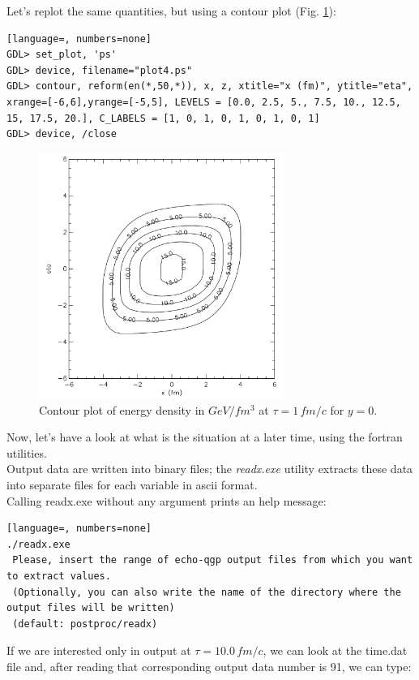 Let's replot the same quantities, but using a contour plot (Fig. \ref{plot4}):
\begin{lstlisting}[language=, numbers=none]
GDL> set_plot, 'ps'
GDL> device, filename="plot4.ps"
GDL> contour, reform(en(*,50,*)), x, z, xtitle="x (fm)", ytitle="eta", xrange=[-6,6],yrange=[-5,5], LEVELS = [0.0, 2.5, 5., 7.5, 10., 12.5, 15, 17.5, 20.], C_LABELS = [1, 0, 1, 0, 1, 0, 1, 0, 1]
GDL> device, /close
\end{lstlisting}
\begin{figure}[!h]
 \begin{center}
  \includegraphics[width=8cm]{images/plot4.pdf}
   \caption{Contour plot of energy density in $GeV/fm^3$ at $\tau=1\,fm/c$ for $y=0$.}
    \label{plot4}
 \end{center}
\end{figure}
Now, let's have a look at what is the situation at a later time, using the fortran utilities.\\
Output data are written into binary files; the \emph{readx.exe} utility extracts these data into separate files for each variable in ascii format.\\
Calling readx.exe without any argument prints an help message:\\
\begin{lstlisting}[language=, numbers=none]
./readx.exe 
 Please, insert the range of echo-qgp output files from which you want to extract values.
 (Optionally, you can also write the name of the directory where the output files will be written)
 (default: postproc/readx) 
\end{lstlisting}
If we are interested only in output at $\tau=10.0\,fm/c$, we can look at the time.dat file and, after reading that corresponding output data number is 91, we can type:\\

